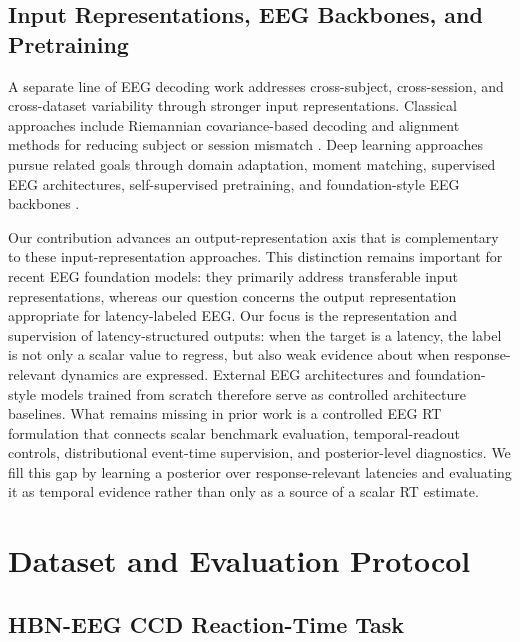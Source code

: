 \documentclass[12pt]{article}
\begin{document}
\subsection{Input Representations, EEG Backbones, and Pretraining}
A separate line of EEG decoding work addresses cross-subject, cross-session, and cross-dataset variability through stronger input representations. Classical approaches include Riemannian covariance-based decoding and alignment methods for reducing subject or session mismatch \citep{Barachant2012RiemannianBCI,Jayaram2016TransferLearningBCI,Zanini2018RiemannianTL,HeWu2020EuclideanAlignment}. Deep learning approaches pursue related goals through domain adaptation, moment matching, supervised EEG architectures, self-supervised pretraining, and foundation-style EEG backbones \citep{Ganin2016DANN,SunSaenko2016DeepCORAL,Kostas2021BENDR,wang2024eegpt,Jiang2024LaBraM,Chen2024EEGFormer,Wang2025EEGMamba,ElOuahidi2025REVE,Yue2024BrainGPT}.

Our contribution advances an output-representation axis that is complementary to these input-representation approaches. This distinction remains important for recent EEG foundation models: they primarily address transferable input representations, whereas our question concerns the output representation appropriate for latency-labeled EEG. Our focus is the representation and supervision of latency-structured outputs: when the target is a latency, the label is not only a scalar value to regress, but also weak evidence about when response-relevant dynamics are expressed. External EEG architectures and foundation-style models trained from scratch therefore serve as controlled architecture baselines. What remains missing in prior work is a controlled EEG RT formulation that connects scalar benchmark evaluation, temporal-readout controls, distributional event-time supervision, and posterior-level diagnostics. We fill this gap by learning a posterior over response-relevant latencies and evaluating it as temporal evidence rather than only as a source of a scalar RT estimate.


\section{Dataset and Evaluation Protocol}
\label{sec:dataset_protocol}

\subsection{HBN-EEG CCD Reaction-Time Task}
\end{document}
